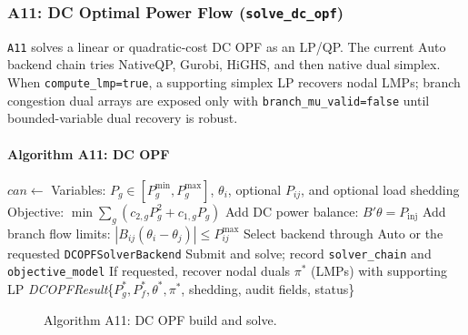 \subsubsection{A11: DC Optimal Power Flow (\texttt{solve\_dc\_opf})}
\label{algo:a11}

\texttt{A11} solves a linear or quadratic-cost DC OPF as an LP/QP.  The current
Auto backend chain tries NativeQP, Gurobi, HiGHS, and then native dual simplex.
When \texttt{compute\_lmp=true}, a supporting simplex LP recovers nodal LMPs;
branch congestion dual arrays are exposed only with
\texttt{branch\_mu\_valid=false} until bounded-variable dual recovery is robust.

\paragraph{Algorithm A11: DC OPF}
\begin{algorithmic}[1]
  \State $\mathit{can} \gets$ 
  \State Variables: $P_g \in [P_g^{\min}, P_g^{\max}]$, $\theta_i$, optional $P_{ij}$, and optional load shedding
  \State Objective: $\min\sum_g (c_{2,g}P_g^2 + c_{1,g}P_g)$
  \State Add DC power balance: $B'\theta = P_\mathrm{inj}$
  \State Add branch flow limits: $|B_{ij}(\theta_i-\theta_j)| \le P_{ij}^{\max}$
  \State Select backend through Auto or the requested \texttt{DCOPFSolverBackend}
  \State Submit and solve; record \texttt{solver\_chain} and \texttt{objective\_model}
  \State If requested, recover nodal duals $\pi^*$ (LMPs) with supporting LP
  \State \Return \textit{DCOPFResult}\{$P_g^*, P_f^*, \theta^*, \pi^*$, shedding, audit fields, status\}
\EndProcedure
\end{algorithmic}

\begin{figure}[H]
\centering
{}
\caption{Algorithm A11: DC OPF build and solve.}
\label{fig:a11-flow}
\end{figure}

